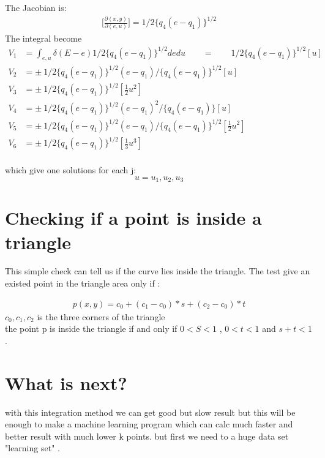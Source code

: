 \documentclass[11pt,a4paper]{article}
\begin{document}
The Jacobian is:
\begin{align}
\bigg[\frac {\partial (x,y)}{\partial (e,u)}\bigg] = 1/2\{ q_4(e-q_1)\}^{1/2}
\end{align}
The integral become
\begin{align}
V_1  &=  \int_{e,u} \delta (E-e)   1/2\{ q_4(e-q_1)\}^{1/2} de du \qquad = \qquad 1/2\{ q_4(e-q_1)\}^{1/2} [u] \\
V_2  &=  \pm \  1/2\{ q_4(e-q_1)\}^{1/2}  (e-q_1)/ \{q_4(e-q_1) \}^{1/2}   [u] \\
V_3  &=  \pm \  1/2\{ q_4(e-q_1)\}^{1/2} [\frac {1}{2}u^2] \\
V_4  &=  \pm \  1/2\{ q_4(e-q_1)\}^{1/2}(e-q_1)^2/ \{q_4(e-q_1) \} [u] \\
V_5  &=  \pm \  1/2\{ q_4(e-q_1)\}^{1/2} (e-q_1)/ \{q_4(e-q_1) \}^{1/2}  [\frac {1}{2}u^2] \\
V_6  &=  \pm \  1/2\{ q_4(e-q_1)\}^{1/2} [\frac{1}{3}u^3] \\
\end{align}

which give one solutions for each j:
\begin{equation}
u = u_1,u_2,u_3
\end{equation}

\section{Checking if a point is inside a triangle}
This simple check can tell us if the curve lies inside the triangle. The test give an existed point in the triangle area only if :

 \begin{align}
p(x,y) = c_0 + (c_1 - c_0) * s + (c_2 - c_0) * t
\end{align}
$c_0,c_1,c_2$ is the three corners of the triangle\\
the point p is inside the triangle if and only if $ 0 <  S  < 1$ ,  $0 < t < 1 $  and $s+t< 1$.

\section{What is next?}
with this integration method we can get good but slow result but this will be enough to make a machine learning program which can calc much faster and better result with much lower k points. but first we need to a huge data set "learning set" .
\end{document}
